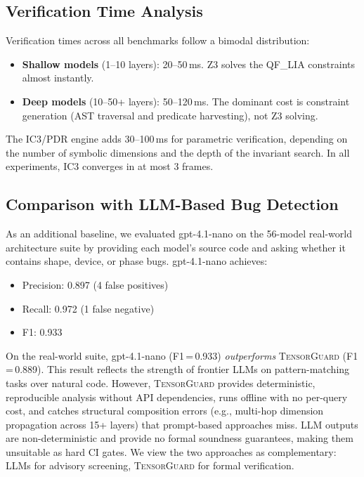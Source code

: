 \documentclass[10pt]{article}
\newcommand{\tguard}{\textsc{TensorGuard}}
\theoremstyle{plain}
\theoremstyle{definition}
\theoremstyle{remark}
\begin{document}
\subsection{Verification Time Analysis}

Verification times across all benchmarks follow a bimodal
distribution:

\begin{itemize}[nosep]
  \item \textbf{Shallow models} (1--10 layers): 20--50\,ms.
    Z3 solves the QF\_LIA constraints almost instantly.
  \item \textbf{Deep models} (10--50+ layers): 50--120\,ms.
    The dominant cost is constraint generation (AST traversal and
    predicate harvesting), not Z3 solving.
\end{itemize}

The IC3/PDR engine adds 30--100\,ms for parametric verification,
depending on the number of symbolic dimensions and the depth of the
invariant search.  In all experiments, IC3 converges in at most 3
frames.

\subsection{Comparison with LLM-Based Bug Detection}

As an additional baseline, we evaluated gpt-4.1-nano on the
56-model real-world architecture suite by providing each model's
source code and asking whether it contains shape, device, or phase
bugs.  gpt-4.1-nano achieves:

\begin{itemize}[nosep]
  \item Precision: 0.897 (4 false positives)
  \item Recall: 0.972 (1 false negative)
  \item F1: 0.933
\end{itemize}

\noindent
On the real-world suite, gpt-4.1-nano (F1\,=\,0.933)
\emph{outperforms} \tguard{} (F1\,=\,0.889).  This result
reflects the strength of frontier LLMs on pattern-matching tasks
over natural code.  However, \tguard{} provides deterministic,
reproducible analysis without API dependencies, runs offline with
no per-query cost, and catches structural composition errors
(e.g., multi-hop dimension propagation across 15+ layers) that
prompt-based approaches miss.  LLM outputs are non-deterministic
and provide no formal soundness guarantees, making them unsuitable
as hard CI gates.  We view the two approaches as complementary:
LLMs for advisory screening, \tguard{} for formal verification.
\end{document}
